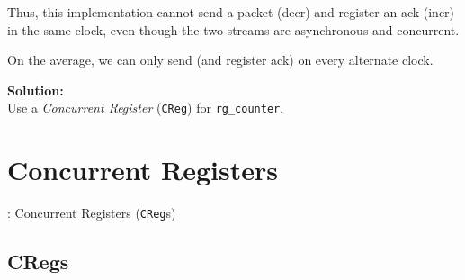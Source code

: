 \begin{frame}[fragile]
\begin{minipage}{0.5\textwidth}
{\scriptsize
Thus, this implementation cannot send a packet (decr) and
register an ack (incr) in the same clock, even though the two streams
are asynchronous and concurrent.}

\vspace{1ex}

{\scriptsize
On the average, we can only send (and register ack) on every alternate clock.}

\vspace{3ex}

{\bf Solution:} \\
Use a \emph{Concurrent Register} ({\tt CReg}) for {\tt rg\_counter}.

\end{minipage}

\end{frame}


\section{Concurrent Registers}

\begin{frame}

\begin{center}
  {\LARGE {\BSV}: Concurrent Registers ({\tt CReg}s)}
\end{center}

\end{frame}


\subsection{CRegs}

